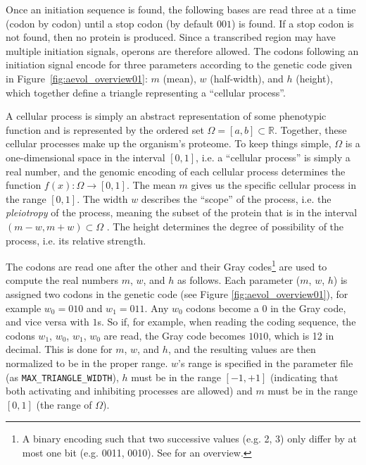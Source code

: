 Once an initiation sequence is found, the following bases are read three at a time (codon by codon) until a stop codon (by default $001$) is found. If a stop codon is not found, then no protein is produced. Since a transcribed region may have multiple initiation signals, operons are therefore allowed. The codons following an initiation signal encode for three parameters according to the genetic code given in Figure~\ref{fig:aevol_overview01}: $m$ (mean), $w$ (half-width), and $h$ (height), which together define a triangle representing a ``cellular process''.

A cellular process is simply an abstract representation of some phenotypic function and is represented by the ordered set $\Omega = \left[ a,b \right] \subset \mathbb{R}$. Together, these cellular processes make up the organism's proteome. To keep things simple, $\Omega$ is a one-dimensional space in the interval $\left[0,1\right]$, i.e. a ``cellular process'' is simply a real number, and the genomic encoding of each cellular process determines the function $f(x) : \Omega \rightarrow \left[0,1\right]$. The mean $m$ gives us the specific cellular process in the range $\left[0,1\right]$. The width $w$ describes the ``scope'' of the process, i.e. the \textit{pleiotropy} of the process, meaning the subset of the protein that is in the interval $ \left(m - w, m + w\right) \subset \Omega$ . The height determines the degree of possibility of the process, i.e. its relative strength.

The codons are read one after the other and their Gray codes\footnote{A binary encoding such that two successive values (e.g. 2, 3) only differ by at most one bit (e.g. 0011, 0010). See \cite{doran2007gray} for an overview.} are used to compute the real numbers $m$, $w$, and $h$ as follows. Each parameter ($m$, $w$, $h$) is assigned two codons in the genetic code (see Figure \ref{fig:aevol_overview01}), for example $w_0 = 010$ and $w_1 = 011$. Any $w_0$ codons become a $0$ in the Gray code, and vice versa with $1$s. So if, for example, when reading the coding sequence, the codons $w_1$, $w_0$, $w_1$, $w_0$ are read, the Gray code becomes $1010$, which is 12 in decimal. This is done for $m$, $w$, and $h$, and the resulting values are then normalized to be in the proper range. $w$'s range is specified in the parameter file (as \texttt{MAX\_TRIANGLE\_WIDTH}), $h$ must be in the range $\left[-1,+1\right]$ (indicating that both activating and inhibiting processes are allowed) and $m$ must be in the range $\left[0,1\right]$ (the range of $\Omega$). 

